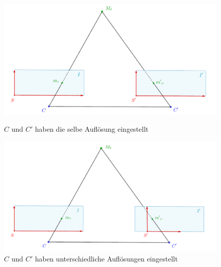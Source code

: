 


 




\begin{figure}[!htb]
	\includegraphics[width=\linewidth]{images/SensorSelbeAufloesung_beschriftet.png}
	\caption[Sensorkoordinatensystem bei Kameras gleicher Auflösung]{$C$ und $C'$ haben die selbe Auflösung eingestellt}
	\label{fig:Aufl1}
	\endminipage\hfill
	\includegraphics[width=\linewidth]{images/SensorUnterschiedlicheAufloesung_beschriftet.png}
	\caption[Sensorkoordinatensystem bei Kameras unterschiedlicher Auflösung]{$C$ und $C'$ haben unterschiedliche Auflösungen eingestellt}
	\label{fig:Aufl2}
	\endminipage\hfill
\end{figure}


